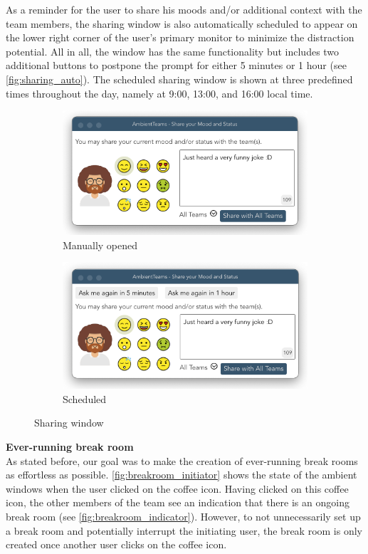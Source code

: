 As a reminder for the user to share his moods and/or additional context with the team members, the sharing window is also automatically scheduled to appear on the lower right corner of the user's primary monitor to minimize the distraction potential. All in all, the window has the same functionality but includes two additional buttons to postpone the prompt for either 5 minutes or 1 hour (see \autoref{fig:sharing_auto}). The scheduled sharing window is shown at three predefined times throughout the day, namely at 9:00, 13:00, and 16:00 local time.

\begin{figure}[h]
    \centering
    \begin{subfigure}{.5\textwidth}
        \centering
        \includegraphics[width=.8\linewidth]{./images/sharing_manual.png}
        \caption{Manually opened }
        \label{fig:sharing_manual}
    \end{subfigure}%
    \begin{subfigure}{.5\textwidth}
        \centering
        \includegraphics[width=.8\linewidth]{./images/sharing_auto.png}
        \caption{Scheduled }
        \label{fig:sharing_auto}
    \end{subfigure}
    \caption{Sharing window}
\end{figure}

\medskip\noindent\textbf{Ever-running break room} \\
As stated before, our goal was to make the creation of ever-running break rooms as effortless as possible. \autoref{fig:breakroom_initiator} shows the state of the ambient windows when the user clicked on the coffee icon. Having clicked on this coffee icon, the other members of the team see an indication that there is an ongoing break room (see \autoref{fig:breakroom_indicator}). However, to not unnecessarily set up a break room and potentially interrupt the initiating user, the break room is only created once another user clicks on the coffee icon.

